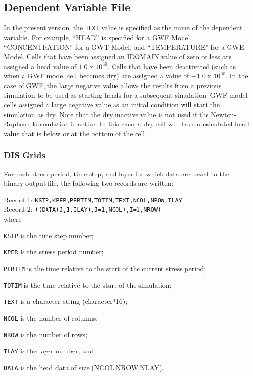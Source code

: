 \subsection{Dependent Variable File}
In the present \mf version, the \texttt{TEXT} value is specified as the name of the dependent variable.  For example, ``HEAD'' is specified for a GWF Model, ``CONCENTRATION'' for a GWT Model, and ``TEMPERATURE'' for a GWE Model.  Cells that have been assigned an IDOMAIN value of zero or less are assigned a head value of $1.0$ x $10^{30}$.  Cells that have been deactivated (such as when a GWF model cell becomes dry) are assigned a value of $-1.0$ x $10^{30}$.  In the case of GWF, the large negative value allows the results from a previous simulation to be used as starting heads for a subsequent simulation.  GWF model cells assigned a large negative value as an initial condition will start the simulation as dry.  Note that the dry inactive value is not used if the Newton-Raphson Formulation is active.  In this case, a dry cell will have a calculated head value that is below or at the bottom of the cell.

\subsubsection{DIS Grids}
For each stress period, time step, and layer for which data are saved to the binary output file, the following two records are written:

\vspace{5mm}
\noindent Record 1: \texttt{KSTP,KPER,PERTIM,TOTIM,TEXT,NCOL,NROW,ILAY} \\
\noindent Record 2: \texttt{((DATA(J,I,ILAY),J=1,NCOL),I=1,NROW)} \\

\vspace{5mm}
\noindent where

\begin{description} \itemsep0pt \parskip0pt 
\item \texttt{KSTP} is the time step number;
\item \texttt{KPER} is the stress period number;
\item \texttt{PERTIM} is the time relative to the start of the current stress period; 
\item \texttt{TOTIM} is the time relative to the start of the simulation;
\item \texttt{TEXT} is a character string (character*16);
\item \texttt{NCOL} is the number of columns;
\item \texttt{NROW} is the number of rows;
\item \texttt{ILAY} is the layer number; and
\item \texttt{DATA} is the head data of size (NCOL,NROW,NLAY).
\end{description}

